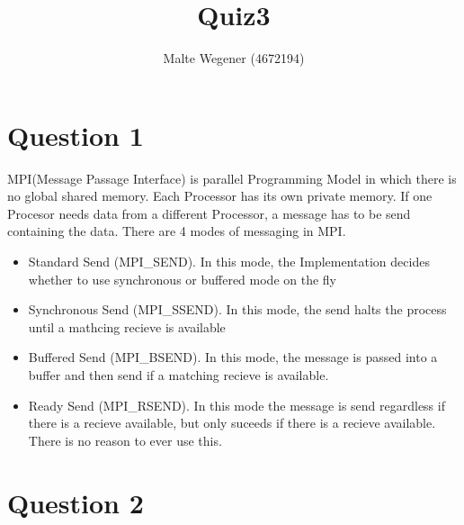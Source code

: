 \documentclass{article}
\begin{document}
\title{Quiz3}
\author{Malte Wegener (4672194)}

\maketitle

\section{Question 1}
MPI(Message Passage Interface) is parallel Programming Model in which there is no global shared memory. Each Processor has its own private memory. If one Procesor needs data from a different Processor, a message has to be send containing the data. There are 4 modes of messaging in MPI.
\begin{itemize}
    \item Standard Send (MPI\_SEND). In this mode, the Implementation decides whether to use synchronous or buffered mode on the fly
    \item Synchronous Send (MPI\_SSEND). In this mode, the send halts the process until a mathcing recieve is available
    \item Buffered Send (MPI\_BSEND). In this mode, the message is passed into a buffer and then send if a matching recieve is available.
    \item Ready Send (MPI\_RSEND). In this mode the message is send regardless if there is a recieve available, but only suceeds if there is a recieve available. There is no reason to ever use this.
\end{itemize}

\section{Question 2}
\end{document}
